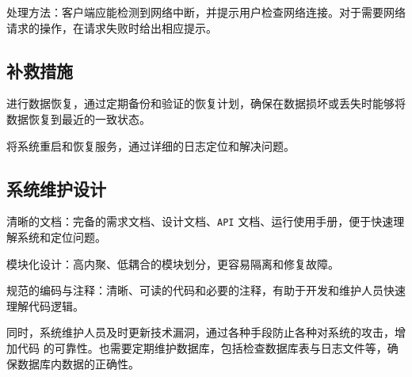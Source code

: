 \documentclass[12pt,a4paper,UTF8]{article}
\begin{document}
处理方法：客户端应能检测到网络中断，并提示用户检查网络连接。对于需要网络请求的操作，在请求失败时给出相应提示。

\subsection{补救措施}

进行数据恢复，通过定期备份和验证的恢复计划，确保在数据损坏或丢失时能够将数据恢复到最近的一致状态。

将系统重启和恢复服务，通过详细的日志定位和解决问题。

\subsection{系统维护设计}

清晰的文档：完备的需求文档、设计文档、\verb|API| 文档、运行使用手册，便于快速理解系统和定位问题。

模块化设计：高内聚、低耦合的模块划分，更容易隔离和修复故障。

规范的编码与注释：清晰、可读的代码和必要的注释，有助于开发和维护人员快速理解代码逻辑。

同时，系统维护人员及时更新技术漏洞，通过各种手段防止各种对系统的攻击，增加代码
的可靠性。也需要定期维护数据库，包括检查数据库表与日志文件等，确保数据库内数据的正确性。
\end{document}
